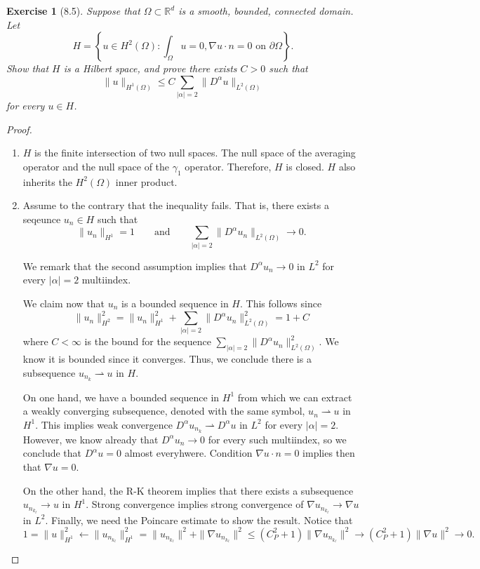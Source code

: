 \documentclass[letterpaper,twoside,11pt]{article}
\theoremstyle{mystyle}
\newtheorem*{exercise}{Exercise}
\newcommand{\R}{{\mathbb R}}
\begin{document}
\newpage
\begin{exercise}[8.5]
  Suppose that $\Omega \subset \R^d$ is a smooth, bounded, connected domain. Let 
  \[H = \left\{ u \in H^2 \left( \Omega \right)  : \int_\Omega u = 0, \nabla u \cdot n = 0 \text{ on } \partial \Omega  \right\}.\]
  Show that $H$ is a Hilbert space, and prove there exists $C > 0$ such that 
  \[\|u\|_{H^1 \left( \Omega \right) } \leq C \sum_{|\alpha| = 2} \|D^\alpha u \|_{L^2 (\Omega)}\]
  for every $u \in H$. 
\end{exercise}

\begin{proof}
  \begin{enumerate}
    \item $H$ is the finite intersection of two null spaces. The null space of the averaging operator and the null space of the $\gamma_1$ operator. Therefore, $H$ is closed. $H$ also inherits the $H^2 \left( \Omega \right)$ inner product. 
    \item Assume to the contrary that the inequality fails. That is, there exists a seqeunce $u_n \in H$ such that 
    \[\|u_n\|_{H^1} = 1 \qquad \text{and} \qquad \sum_{|\alpha| = 2} \|D^\alpha u_n \|_{L^2 (\Omega)} \to 0 . \]

    We remark that the second assumption implies that $D^\alpha u_n \to 0$ in $L^2$ for every $|\alpha| = 2$ multiindex.

    We claim now that $u_n$ is a bounded sequence in $H$. This follows since 
    \[\|u_n\|_{H^2}^2 = \|u_n\|_{H^1}^2 + \sum_{|\alpha| = 2} \|D^\alpha u_n \|_{L^2 (\Omega)}^2 = 1 + C\]
    where $C<\infty$ is the bound for the sequence $\sum_{|\alpha| = 2} \|D^\alpha u_n \|_{L^2 (\Omega)}^2$. We know it is bounded since it converges. Thus, we conclude there is a subsequence $u_{n_k} \rightharpoonup u$ in $H$. 

    On one hand, we have a bounded sequence in $H^1$ from which we can extract a weakly converging subsequence, denoted with the same symbol, $u_n \rightharpoonup u$ in $H^1$. 
    This implies weak convergence $D^\alpha u_{n_k} \rightharpoonup D^\alpha u$ in $L^2$ for every $|\alpha| = 2$. However, we know already that $D^\alpha u_n \to 0$ for every such multiindex, so we conclude that $D^\alpha u = 0$ almost everyhwere. Condition $\nabla u \cdot n = 0$ implies then that $\nabla u = 0$. 

    On the other hand, the R-K theorem implies that there exists a subsequence $u_{n_{k_\ell}} \to u$ in $H^1$. Strong convergence implies strong convergence of $ \nabla u_{n_{k_\ell}} \to \nabla u $ in $L^2$. Finally, we need the Poincare estimate to show the result. Notice that 
    \[1=\|u\|^2_{H^1} \leftarrow \|u_{n_{k_\ell}}\|^2_{H^1}= \|u_{n_{k_\ell}}\|^2 + \|\nabla u_{n_{k_\ell}} \|^2 \leq \left( C_P^2 + 1 \right)\|\nabla u_{n_{k_\ell}} \|^2 \to \left( C_P^2 + 1 \right) \|\nabla u \|^2 \to 0.\]
    


  \end{enumerate}
\end{proof}
\end{document}
